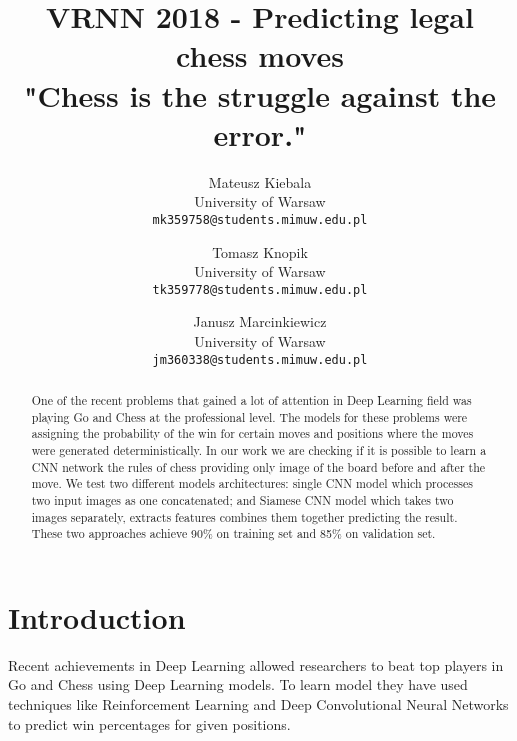 \documentclass[10pt,twocolumn,letterpaper]{article}
\begin{document}
\title{VRNN 2018 - Predicting legal chess moves \\ \large {\small "Chess is the struggle against the error."} }


\author{Mateusz Kiebala\\
University of Warsaw\\
{\tt\small mk359758@students.mimuw.edu.pl}
\and
Tomasz Knopik\\
University of Warsaw\\
{\tt\small tk359778@students.mimuw.edu.pl}
\and
Janusz Marcinkiewicz\\
University of Warsaw\\
{\tt\small jm360338@students.mimuw.edu.pl}}

\maketitle

\begin{abstract}
   One of the recent problems that gained a lot of attention in Deep Learning
   field was playing Go and Chess at the professional level. The models for these
   problems were assigning the probability of the win for certain moves and
   positions where the moves were generated deterministically. In our work we are
   checking if it is possible to learn a CNN network the rules of chess
   providing only image of the board before and after the move. We test two
   different models architectures: single CNN model which processes two input
   images as one concatenated; and Siamese CNN model which takes two images
   separately, extracts features combines them together predicting the result.
   These two approaches achieve 90\% on training set and 85\% on validation set.
\end{abstract}

\section{Introduction}

Recent achievements in Deep Learning allowed researchers to beat top players in
Go and Chess using Deep Learning models. To learn model they have used
techniques like Reinforcement Learning and Deep Convolutional Neural Networks to
predict win percentages for given positions.
\end{document}
